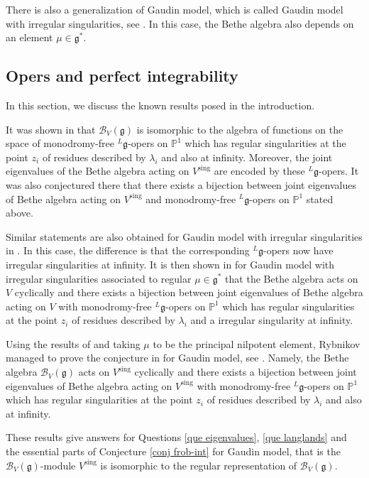 \documentclass[11pt,reqno]{amsart}
\numberwithin{equation}{section}
\theoremstyle{definition}
\theoremstyle{remark}
\newcommand{\mc}{\mathcal}
\newcommand{\g}{\mathfrak{g}}
\newcommand{\sing}{{\mathrm{sing}}}
\newcommand{\la}{\lambda}
\begin{document}
There is also a generalization of Gaudin model, which is called Gaudin model with irregular singularities, see \cite{Ryb:2006,FFTL:2010}. In this case, the Bethe algebra also depends on an element $\mu\in\g^*$.

\subsection{Opers and perfect integrability} \label{sec oper-frob}
In this section, we discuss the known results posed in the introduction.

It was shown in \cite[Theorem 2.7]{Fre:2005} that $\mc B_V(\g)$ is isomorphic to the algebra of functions on the space of monodromy-free $^L\g$-opers on $\mathbb P^1$ which has regular singularities at the point $z_i$ of residues described by $\la_i$ and also at infinity. Moreover, the joint eigenvalues of the Bethe algebra acting on $V^\sing$ are encoded by these $^L\g$-opers. It was also conjectured there that there exists a bijection between joint eigenvalues of Bethe algebra acting on $V^\sing$ and monodromy-free $^L\g$-opers on $\mathbb P^1$ stated above. 

Similar statements are also obtained for Gaudin model with irregular singularities in \cite{FFTL:2010}. In this case, the difference is that the corresponding $^L\g$-opers now have irregular singularities at infinity. It is then shown in \cite[Corollary 5]{FFRy:2010} for Gaudin model with irregular singularities associated to regular $\mu\in\g^*$ that the Bethe algebra acts on $V$ cyclically and there exists a bijection between joint eigenvalues of Bethe algebra acting on $V$ with monodromy-free $^L\g$-opers on $\mathbb P^1$ which has regular singularities at the point $z_i$ of residues described by $\la_{i}$ and a irregular singularity at infinity. %

Using the results of \cite{FFTL:2010} and taking $\mu$ to be the principal nilpotent element, Rybnikov managed to prove the conjecture in \cite{Fre:2005} for Gaudin model, see \cite{Ryb:2018}. Namely, the Bethe algebra $\mc B_V(\g)$ acts on $V^\sing$ cyclically and there exists a bijection between joint eigenvalues of Bethe algebra acting on $V^\sing$ with monodromy-free $^L\g$-opers on $\mathbb P^1$ which has regular singularities at the point $z_i$ of residues described by $\la_i$ and also at infinity. 

These results give answers for Questions \ref{que eigenvalues}, \ref{que langlands} and the essential parts of Conjecture \ref{conj frob-int} for Gaudin model, that is the $\mc B_V(\g)$-module $V^\sing$ is isomorphic to the regular representation of $\mc B_V(\g)$. 
\end{document}
